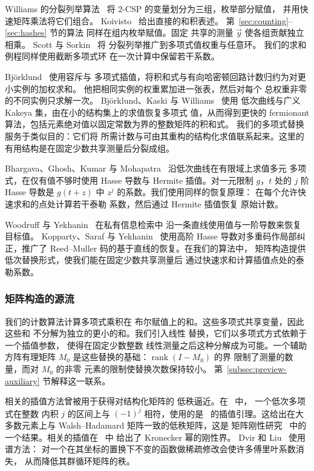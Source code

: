 \documentclass[11pt,reqno]{amsart}
\numberwithin{equation}{section}
\theoremstyle{definition}\newtheorem{definition}[theorem]{定义}
\theoremstyle{remark}\newtheorem{remark}[theorem]{注}
\begin{document}
Williams 的分裂列举算法~\cite{Wil05} 将
$2$-CSP 的变量划分为三组，枚举部分赋值，
并用快速矩阵乘法将它们组合。
Koivisto~\cite{Koi06} 给出直接的和积表述。
第~\ref{sec:counting}--\ref{sec:hashes} 节的算法
同样在组内枚举赋值。固定
共享的测量 $\vec y$ 使各组贡献独立相乘。
Scott 与 Sorkin~\cite[第~6 节]{SS09} 将
分裂列举推广到多项式值权重与任意环。
我们的求和例程同样使用截断多项式环
在一次计算中保留若干系数。

Bj\"orklund~\cite[第~2--3 节]{Bjo16} 使用容斥与
多项式插值，将积和式与有向哈密顿回路计数归约为对更小实例的加权求和。
他把相同实例的权重累加进一张表，然后对每个
总权重非零的不同实例只求解一次。
Bj\"orklund、Kaski 与 Williams~\cite{BKW19} 使用
低次曲线与广义 Kakeya 集，由在小的结构集上的求值恢复多项式
值，从而得到更快的 fermionant 算法，包括元素绝对值以固定常数为界的整数矩阵的积和式。
我们的多项式替换服务于类似目的：它们将
所需计数与可由其重构的结构化求值联系起来。这里的
有用结构是在固定少数共享测量后分裂成组。

Bhargava、Ghosh、Kumar 与
Mohapatra~\cite[第~3.1--3.2 节]{BGKM23} 沿低次曲线在有限域上求值多元
多项式，在仅有值不够时使用
Hasse 导数与 Hermite 插值。对一元限制 $g$，$t$ 处的 $j$ 阶
Hasse 导数是 $g(t+z)$ 中 $z^j$ 的系数。我们使用同样的恢复原理：
在每个允许快速求和的点处计算若干泰勒
系数，然后通过 Hermite 插值恢复
原始计数。

Woodruff 与 Yekhanin~\cite{WY07} 在私有信息检索中
沿一条直线使用值与一阶导数来恢复目标值。
Kopparty、Saraf 与 Yekhanin~\cite{KSY14} 使用高阶
Hasse 导数对多重码作局部纠正，推广了
Reed--Muller 码的基于直线的恢复。在我们的算法中，
矩阵构造提供低次替换形式，使我们能在固定少数共享测量后
通过快速求和计算插值点处的泰勒系数。
\subsubsection{矩阵构造的源流}\label{subsec:related-spectral}
我们的计数算法计算多项式乘积在
布尔赋值上的和。这些多项式共享变量，因此这些和
不分解为独立的更小的和。我们引入线性
替换，它们以多项式方式依赖于一个插值参数，
使得在固定少数整数
线性测量之后这种分解成为可能。一个辅助方阵有理矩阵 $M_0$
是这些替换的基础：$\operatorname{rank}(I-M_0)$ 的界
限制了测量的数量，而对 $M_0$ 的非零
元素的限制使替换次数保持较小。
第~\ref{subsec:preview-auxiliary} 节解释这一联系。

相关的插值方法曾被用于获得对结构化矩阵的
低秩逼近。在~\cite[第~3 节]{AW17} 中，
一个低次多项式在整数
内积 $j$ 的区间上与 $(-1)^j$ 相符，使用的是~\cite[引理~3.1]{AW15}
的插值引理。这给出在大多数元素上与
Walsh--Hadamard 矩阵一致的低秩矩阵，这是
矩阵刚性研究~\cite{Val77} 中的一个结果。相关的插值在~\cite[定理~6.1]{AGP23} 中
给出了 Kronecker 幂的刚性界。
Dvir 和 Liu~\cite[断言~2.20 与引理~3.3--3.4]{DL20} 使用谱方法：
对一个在其坐标的置换下不变的函数做稀疏修改会使许多傅里叶系数消失，
从而降低其群循环矩阵的秩。
\end{document}
